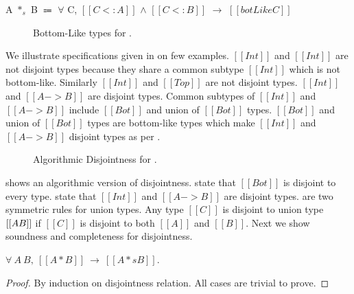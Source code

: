 \begin{definition}
\label{def:union:disj}
  A $*_s$ B $\Coloneqq$ $\forall$ C, $[[C <: A]]$ $\wedge$ $[[C <: B]]$ $\rightarrow$ $[[botLike C]]$
\end{definition}

\begin{figure}[t]
  \begin{small}
    \centering
  \end{small}
  \caption{Bottom-Like types for \dut.}
  \label{fig:union:bl}
\end{figure}

\noindent We illustrate specifications given in  on few examples. 
$[[Int]]$ and $[[Int]]$ are not disjoint types because they share a common subtype $[[Int]]$ which
is not bottom-like. Similarly $[[Int]]$ and $[[Top]]$ are not disjoint types. $[[Int]]$ and $[[A -> B]]$
are disjoint types. Common subtypes of $[[Int]]$ and $[[A -> B]]$ include $[[Bot]]$ and union of 
$[[Bot]]$ types. $[[Bot]]$ and union of $[[Bot]]$ types are bottom-like types which make $[[Int]]$ and 
$[[A -> B]]$ disjoint types as per .

\begin{figure}[t]
  \begin{small}
    \centering
  \end{small}
  \caption{Algorithmic Disjointness for \dut.}
  \label{fig:union:ad}
\end{figure}

\noindent {} shows an algorithmic version of disjointness.
 state that $[[Bot]]$ is disjoint to every type.
 state that $[[Int]]$ and $[[A -> B]]$ are disjoint types.
 are two symmetric rules for union types. Any type $[[C]]$ is disjoint
to union type $[[A \/ B]]$ if $[[C]]$ is disjoint to both $[[A]]$ and $[[B]]$. Next we show
soundness and completeness for disjointness.

\begin{lemma}[Soundness]
\label{lemma:union:sound}
$\forall ~ A ~ B, ~[[A * B]] ~ \rightarrow ~ [[A *s B]]$.
\end{lemma}

\begin{proof}
By induction on disjointness relation.
All cases are trivial to prove.
\end{proof}

